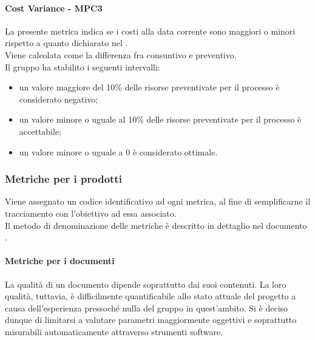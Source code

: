 \documentclass[PianoDiQualifica.tex]{subfiles}
\begin{document}
			\hypertarget{Cost_m}{\paragraph{Cost Variance - MPC3}}
			La presente metrica indica se i costi alla data corrente sono maggiori o minori rispetto a quanto dichiarato nel \PPdocRR{}. \\
			Viene calcolata come la differenza fra consuntivo e preventivo. \\
			Il gruppo ha stabilito i seguenti intervalli:
			\begin{itemize}
				\item un valore maggiore del 10\% delle risorse preventivate per il processo è considerato negativo;
				\item un valore minore o uguale al 10\% delle risorse preventivate per il processo è accettabile;
				\item un valore minore o uguale a 0 è considerato ottimale.
			\end{itemize}
			
		\subsubsection{Metriche per i prodotti}
		Viene assegnato un codice identificativo ad ogni metrica, al fine di semplificarne il tracciamento con l'obiettivo ad essa associato. \\
		Il metodo di denominazione delle metriche è descritto in dettaglio nel documento \NPdocRR{}.
		
			\paragraph{Metriche per i documenti}
			La qualità di un documento dipende soprattutto dai suoi contenuti. La loro qualità, tuttavia, è difficilmente quantificabile allo stato attuale del progetto a causa
			dell’esperienza pressoché nulla del gruppo in quest’ambito. Si è deciso dunque di limitarsi a valutare parametri maggiormente oggettivi e soprattutto misurabili automaticamente
			attraverso strumenti software.
			
\end{document}
